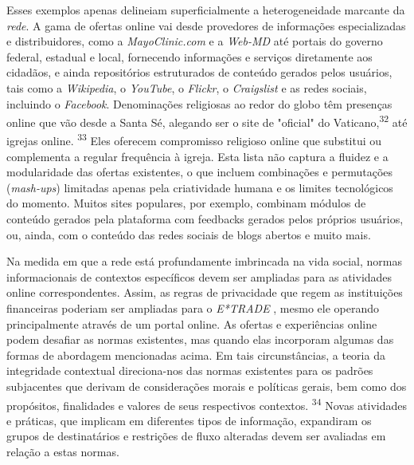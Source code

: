 Esses exemplos apenas delineiam superficialmente a heterogeneidade
marcante da \emph{rede}. A gama de ofertas online vai desde provedores
de informações especializadas e distribuidores, como a
\emph{MayoClinic.com} e a \emph{Web-MD} até portais do governo federal,
estadual e local, fornecendo informações e serviços diretamente aos
cidadãos, e ainda repositórios estruturados de conteúdo gerados pelos
usuários, tais como a \emph{Wikipedia}, o \emph{YouTube}, o
\emph{Flickr}, o \emph{Craigslist} e as redes sociais, incluindo o
\emph{Facebook}. Denominações religiosas ao redor do globo têm presenças
online que vão desde a Santa Sé, alegando ser o site de "oficial" do
Vaticano,\textsuperscript{{32}} até igrejas online.
\textsuperscript{{33}} Eles oferecem compromisso religioso online que
substitui ou complementa a regular frequência à igreja. Esta lista não
captura a fluidez e a modularidade das ofertas existentes, o que incluem
combinações e permutações (\emph{mash-ups}) limitadas apenas pela
criatividade humana e os limites tecnológicos do momento. Muitos sites
populares, por exemplo, combinam módulos de conteúdo gerados pela
plataforma com feedbacks gerados pelos próprios usuários, ou, ainda, com
o conteúdo das redes sociais de blogs abertos e muito mais.

Na medida em que a rede está profundamente imbrincada na vida social,
normas informacionais de contextos específicos devem ser ampliadas para
as atividades online correspondentes. Assim, as regras de privacidade
que regem as instituições financeiras poderiam ser ampliadas para o
\emph{E*TRADE} , mesmo ele operando principalmente através de um portal
online. As ofertas e experiências online podem desafiar as normas
existentes, mas quando elas incorporam algumas das formas de abordagem
mencionadas acima. Em tais circunstâncias, a teoria da integridade
contextual direciona-nos das normas existentes para os padrões
subjacentes que derivam de considerações morais e políticas gerais, bem
como dos propósitos, finalidades e valores de seus respectivos
contextos. \textsuperscript{{34}} Novas atividades e práticas, que
implicam em diferentes tipos de informação, expandiram os grupos de
destinatários e restrições de fluxo alteradas devem ser avaliadas em
relação a estas normas.

